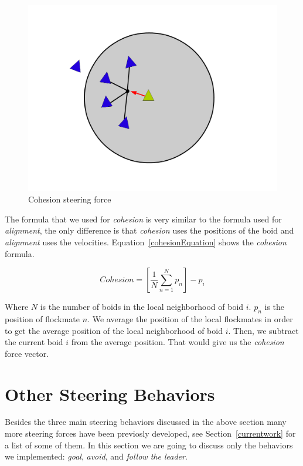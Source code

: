 \begin{figure}[htbp]
\begin{center}
\includegraphics[scale=0.3]{figures/cohesion.pdf}
\caption{Cohesion steering force}
\label{cohesionPDF}
\end{center}
\end{figure}

The formula that we used for \textit{cohesion} is very similar to the formula used for \textit{alignment}, the only difference is that \textit{cohesion} uses the positions of the boid and \textit{alignment} uses the velocities. Equation~\ref{cohesionEquation} shows the \textit{cohesion} formula.

\begin{equation}
\label{cohesionEquation}
Cohesion = \left[  \frac{1}{N} \sum_{n=1}^{N} p_n \right ] - p_i
\end{equation}

Where $N$ is the number of boids in the local neighborhood of boid $i$. $p_n$ is the position of flockmate $n$. We average the position of the local flockmates in order to get the average position of the local neighborhood of boid $i$. Then, we subtract the current boid $i$ from the average position. That would give us the \textit{cohesion} force vector.

\section{Other Steering Behaviors}\label{otherbehaviors}
Besides the three main steering behaviors discussed in the above section many more steering forces have been previosly developed, see Section~\ref{currentwork} for a list of some of them. In this section we are going to discuss only the behaviors we implemented: \textit{goal}, \textit{avoid}, and \textit{follow the leader}.

